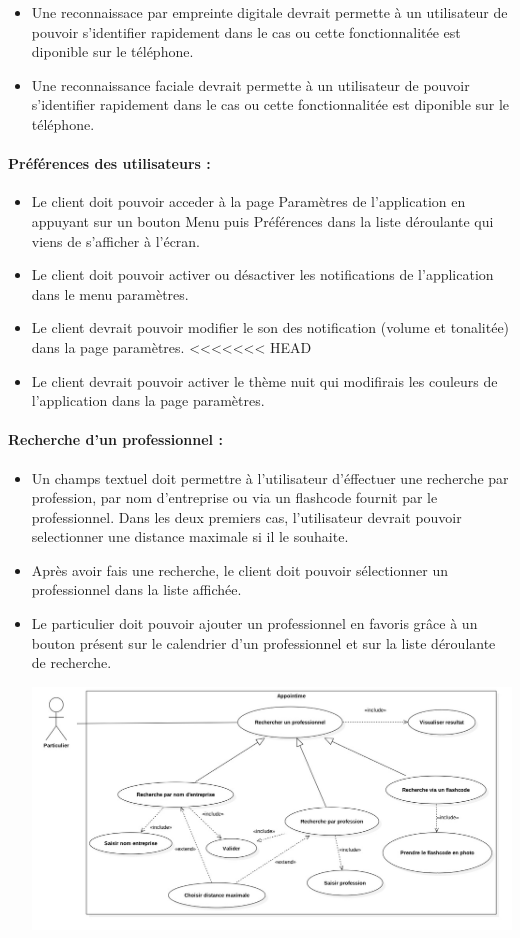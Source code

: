 \documentclass{article}
\begin{document}
\begin{itemize}
\begin{itemize}
\item Une reconnaissace par empreinte digitale devrait permette à un
  utilisateur de pouvoir s'identifier rapidement dans le cas ou cette
  fonctionnalitée est diponible sur le téléphone.
\item Une reconnaissance faciale devrait permette à un
  utilisateur de pouvoir s'identifier rapidement dans le cas ou cette
  fonctionnalitée est diponible sur le téléphone.
\end{itemize}
\paragraph{Préférences des utilisateurs :}
\begin{itemize}
\item Le client doit pouvoir acceder à la page \og Paramètres \fg{} de l'application en
  appuyant sur un bouton \og Menu \fg{} puis \og Préférences \fg{}
  dans la liste déroulante qui viens de s'afficher à l'écran.
\item Le client doit pouvoir activer ou désactiver les notifications
  de l'application dans le menu paramètres.
\item Le client devrait pouvoir modifier le son des notification
  (volume et tonalitée) dans la page paramètres.
<<<<<<< HEAD
\item Le client devrait pouvoir activer le thème nuit qui modifirais les
  couleurs de l'application dans la page paramètres.
\end{itemize}
\paragraph{Recherche d'un professionnel :}
\begin{itemize}
\item Un champs textuel doit permettre à l'utilisateur d'éffectuer une
  recherche par profession, par nom
  d'entreprise ou via un flashcode fournit par le professionnel. Dans
  les deux premiers cas, l'utilisateur devrait pouvoir selectionner
  une distance maximale si il le souhaite.
\item Après avoir fais une recherche, le client doit pouvoir sélectionner un
  professionnel dans la liste affichée.
\item Le particulier doit pouvoir ajouter un professionnel en favoris grâce
  à un bouton présent sur le calendrier d'un professionnel et sur la
  liste déroulante de recherche.

\includegraphics[scale=0.3]{ShematDiagrammes/useCaseRecherchePro.jpg}


\end{itemize}
\end{itemize}
\end{document}
